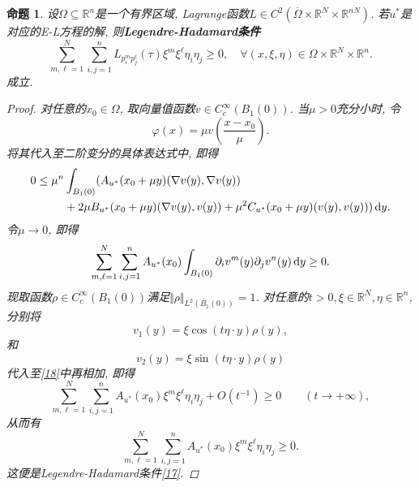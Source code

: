 \documentclass[12pt,a4paper]{article}
\newtheorem{proposition}[theorem]{命题}
\begin{document}
\begin{proposition}
    设$\Omega \subseteq \mathbb{R}^n$是一个有界区域, Lagrange函数$L \in C^2(\overline{\Omega} \times \mathbb{R}^N \times \mathbb{R}^{nN})$.
    若$u^*$是对应的E-L方程的解, 则\textbf{Legendre-Hadamard条件}
    \begin{equation}\label{17}
        \boxed{\sum_{m, \ell = 1}^N\sum_{i, j = 1}^nL_{p_i^mp_j^\ell}(\tau)\xi^m\xi^\ell\eta_i\eta_j \geq 0, \quad \forall (x, \xi, \eta) \in \Omega \times \mathbb{R}^N \times \mathbb{R}^n.} 
    \end{equation}
    成立.
    \begin{proof}
        对任意的$x_0 \in \Omega$, 取向量值函数$v \in C_c^{\infty}(B_1(0))$. 当$\mu > 0$充分小时, 令 
        \begin{equation*}
            \varphi(x) = \mu v\left(\frac{x - x_0}{\mu}\right). 
        \end{equation*}
        将其代入至二阶变分的具体表达式中, 即得 
        \begin{align*}
            0 \leq \mu^n&\int_{B_1(0)}(A_{u^*}(x_0 + \mu y)(\nabla v(y), \nabla v(y)) \\&
            + 2\mu B_{u^*}(x_0 + \mu y)(\nabla v(y), v(y)) + \mu^2C_{u^*}(x_0 + \mu y)(v(y), v(y))) \,{\rm d}y.
        \end{align*}
        令$\mu \rightarrow 0$, 即得
        \begin{equation}\label{18}
            \sum_{m, \ell = 1}^N\sum_{i, j = 1}^nA_{u^*}(x_0)\int_{B_1(0)}\partial_iv^m(y)\partial_jv^n(y) \,{\rm d}y \geq 0.
        \end{equation}
        现取函数$\rho \in C_c^{\infty}(B_1(0))$满足$\Vert \rho \Vert_{L^2(B_1(0))} = 1$.
        对任意的$t > 0, \xi \in \mathbb{R}^N, \eta \in \mathbb{R}^n$, 分别将 
        \begin{equation*}
            v_1(y) = \xi\cos(t\eta \cdot y)\rho(y), 
        \end{equation*}
        和
        \begin{equation*}
            v_2(y) = \xi\sin(t\eta \cdot y)\rho(y)
        \end{equation*}
        代入至\eqref{18}中再相加, 即得 
        \begin{equation*}
            \sum_{m, \ell = 1}^N\sum_{i, j = 1}^nA_{u^*}(x_0)\xi^m\xi^\ell\eta_i\eta_j + O(t^{-1}) \geq 0 \qquad (t \rightarrow +\infty), 
        \end{equation*}
        从而有 
        \begin{equation*}
            \sum_{m, \ell = 1}^N\sum_{i, j = 1}^nA_{u^*}(x_0)\xi^m\xi^\ell\eta_i\eta_j \geq 0.
        \end{equation*}
        这便是Legendre-Hadamard条件\eqref{17}.
    \end{proof}
\end{proposition}
\end{document}
